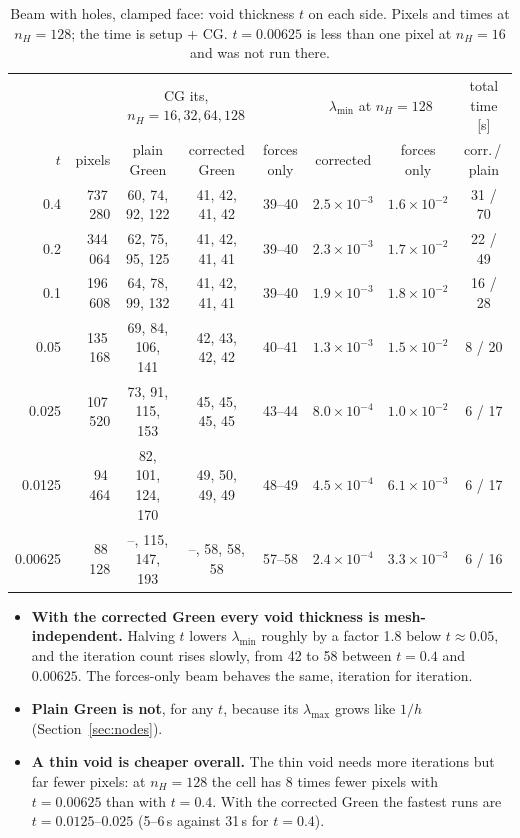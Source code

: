 \documentclass[11pt,a4paper]{article}
\begin{document}
\begin{table}[h]
  \centering\footnotesize\setlength{\tabcolsep}{4pt}
  \begin{tabular}{rrcccccc}
    \toprule
    & & \multicolumn{2}{c}{CG its, $n_H = 16, 32, 64, 128$} & & \multicolumn{2}{c}{$\lambda_{\min}$ at $n_H = 128$} &
    total time [s] \\
    $t$ & pixels & plain Green & corrected Green & forces only & corrected & forces only & corr.\,/\,plain \\
    \midrule
    0.4     & 737\,280 & 60, 74, 92, 122  & 41, 42, 41, 42 & 39--40 & $2.5\times10^{-3}$ & $1.6\times10^{-2}$ & 31 / 70 \\
    0.2     & 344\,064 & 62, 75, 95, 125  & 41, 42, 41, 41 & 39--40 & $2.3\times10^{-3}$ & $1.7\times10^{-2}$ & 22 / 49 \\
    0.1     & 196\,608 & 64, 78, 99, 132  & 41, 42, 41, 41 & 39--40 & $1.9\times10^{-3}$ & $1.8\times10^{-2}$ & 16 / 28 \\
    0.05    & 135\,168 & 69, 84, 106, 141 & 42, 43, 42, 42 & 40--41 & $1.3\times10^{-3}$ & $1.5\times10^{-2}$ & 8 / 20 \\
    0.025   & 107\,520 & 73, 91, 115, 153 & 45, 45, 45, 45 & 43--44 & $8.0\times10^{-4}$ & $1.0\times10^{-2}$ & 6 / 17 \\
    0.0125  &  94\,464 & 82, 101, 124, 170 & 49, 50, 49, 49 & 48--49 & $4.5\times10^{-4}$ & $6.1\times10^{-3}$ & 6 / 17 \\
    0.00625 &  88\,128 & --, 115, 147, 193 & --, 58, 58, 58 & 57--58 & $2.4\times10^{-4}$ & $3.3\times10^{-3}$ & 6 / 16 \\
    \bottomrule
  \end{tabular}
  \caption{Beam with holes, clamped face: void thickness $t$ on each side. Pixels and times at $n_H = 128$; the time is
  setup + CG. $t = 0.00625$ is less than one pixel at $n_H = 16$ and was not run there.}
  \label{tab:thin_void}
\end{table}

\begin{itemize}
  \item \textbf{With the corrected Green every void thickness is mesh-independent.} Halving $t$ lowers
        $\lambda_{\min}$ roughly by a factor 1.8 below $t \approx 0.05$, and the iteration count rises slowly, from 42
        to 58 between $t = 0.4$ and $0.00625$. The forces-only beam behaves the same, iteration for iteration.
  \item \textbf{Plain Green is not}, for any $t$, because its $\lambda_{\max}$ grows like $1/h$ (Section~\ref{sec:nodes}).
  \item \textbf{A thin void is cheaper overall.} The thin void needs more iterations but far fewer pixels: at
        $n_H = 128$ the cell has 8 times fewer pixels with $t = 0.00625$ than with $t = 0.4$. With the corrected Green the
        fastest runs are $t = 0.0125$--$0.025$ (5--6\,s against 31\,s for $t = 0.4$).
\end{itemize}
\end{document}
